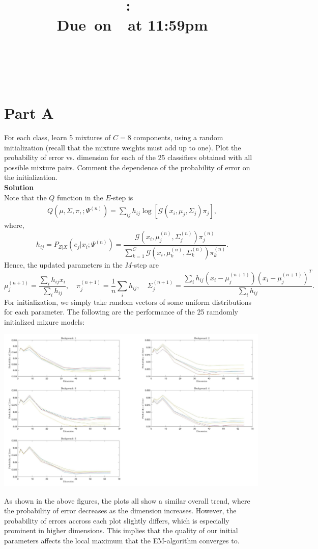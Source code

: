 \documentclass{article}
\title{
    \vspace{2in}
    \textmd{\textbf{\hmwkClass:\ \hmwkTitle}}\\
    \normalsize\vspace{0.1in}\small{Due\ on\ \hmwkDueDate\ at 11:59pm}\\
    \vspace{0.1in}\large{\textit{\hmwkClassInstructor}} \\
    \vspace{3in}
}
\author{
  \hmwkAuthorName \\
  \vspace{0.1in}\small\hmwkPID
}
\date{}
\newcommand*{\G}{\mathcal{G}}
\begin{document}
\maketitle

\pagebreak

\section*{Part A}

For each class, learn 5 mixtures of $C = 8$ components, using a random initialization (recall that the mixture weights must add up to one). Plot the probability of error vs. dimension for each of the 25 classifiers obtained with all possible mixture pairs. Comment the dependence of the probability of error on the initialization. \\

\textbf{\large Solution}
\\

Note that the $Q$ function in the $E$-step is
\begin{align*}
    Q(\mu, \Sigma, \pi, ; \Psi^{(n)}) = \sum_{ij} h_{ij} \log[\G(x_i, \mu_j, \Sigma_j)\pi_j],
\end{align*}
where,
\[
    h_{ij} = P_{Z|X}(e_j | x_i ; \Psi^{(n)}) = \frac{\G(x_i, \mu_j^{(n)}, \Sigma_j^{(n)})\pi_j^{(n)}}{\sum_{k = 1}^C \G(x_i, \mu_k^{(n)}, \Sigma_k^{(n)})\pi_k^{(n)}}.
\]
Hence, the updated parameters in the $M$-step are
\[
    \mu_j^{(n + 1)} = \frac{\sum_i h_{ij}x_i}{\sum_i h_{ij}}, \quad \pi_j^{(n + 1)} = \frac{1}{n}\sum_i h_{ij}, \quad \Sigma_j^{(n + 1)} = \frac{\sum_i h_{ij} (x_i - \mu_j^{(n + 1)})(x_i - \mu_j^{(n + 1)})^T}{\sum_i h_{ij}}.
\]
For initialization, we simply take random vectors of some uniform distributions for each parameter. The following are the performance of the 25 ramdomly initialized mixure models:
\begin{center}
    \includegraphics[width=0.99\textwidth]{partA}
\end{center}
As shown in the above figures, the plots all show a similar overall trend, where the probability of error decreases as the dimension increases. However, the probability of errors accross each plot slightly differs, which is especially prominent in higher dimensions. This implies that the quality of our initial parameters affects the local maximum that the EM-algorithm converges to. \\
\end{document}

